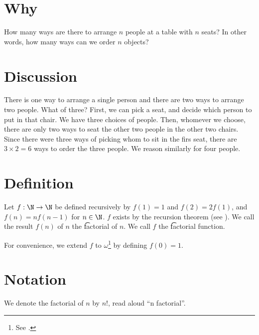 
\section*{Why}

How many ways are there to arrange $n$ people at a table with $n$ seats?
In other words, how many ways can we order $n$ objects?

\section*{Discussion}

There is one way to arrange a single person and there are two ways to arrange two people.
What of three?
First, we can pick a seat, and decide which person to put in that chair.
We have three choices of people.
Then, whomever we choose, there are only two ways to seat the other two people in the other two chairs.
Since there were three ways of picking whom to sit in the firs seat, there are $3\times 2 = 6$ ways to order the three people.
We reason similarly for four people.

\section*{Definition}

Let $f: \N   \to \N  $ be defined recursively by $f(1) = 1$ and $f(2) = 2f(1)$, and $f(n) = nf(n-1)$ for $n \in \N  $.
$f$ exists by the recursion theorem (see ).
We call the result $f(n)$ of $n$ the \t{factorial} of $n$.
We call $f$ the \t{factorial function}.

For convenience, we extend $f$ to $\omega $\footnote{See .}
by defining $f(0) = 1$.

\section*{Notation}

We denote the factorial of $n$ by $n!$, read aloud ``n factorial''.

\blankpage